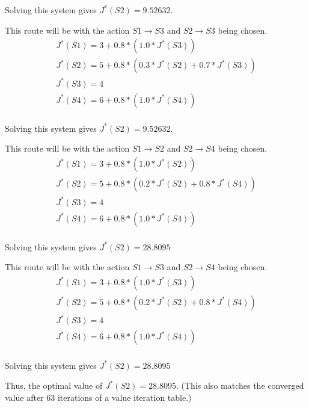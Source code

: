 \documentclass[11pt]{article}
\begin{document}
Solving this system gives $J^*(S2) = 9.52632$.

This route will be with the action $S1 \rightarrow S3$ and $S2 \rightarrow S3$ being chosen.
\begin{eqnarray*}
J^*(S1) = 3 + 0.8*(1.0 * J^*(S3))\\
J^*(S2) = 5 + 0.8*(0.3*J^*(S2) + 0.7*J^*(S3))\\
J^*(S3) = 4\\
J^*(S4) = 6 + 0.8*(1.0 * J^*(S4))\\
\end{eqnarray*}

Solving this system gives $J^*(S2) = 9.52632$.

This route will be with the action $S1 \rightarrow S2$ and $S2 \rightarrow S4$ being chosen.
\begin{eqnarray*}
J^*(S1) = 3 + 0.8*(1.0 * J^*(S2))\\
J^*(S2) = 5 + 0.8*(0.2*J^*(S2) + 0.8*J^*(S4))\\
J^*(S3) = 4\\
J^*(S4) = 6 + 0.8*(1.0 * J^*(S4))\\
\end{eqnarray*}

Solving this system gives $J^*(S2) = 28.8095$

This route will be with the action $S1 \rightarrow S3$ and $S2 \rightarrow S4$ being chosen.
\begin{eqnarray*}
J^*(S1) = 3 + 0.8*(1.0 * J^*(S3))\\
J^*(S2) = 5 + 0.8*(0.2*J^*(S2) + 0.8*J^*(S4))\\
J^*(S3) = 4\\
J^*(S4) = 6 + 0.8*(1.0 * J^*(S4))\\
\end{eqnarray*}

Solving this system gives $J^*(S2) = 28.8095$


Thus, the optimal value of $J^*(S2) = 28.8095$. (This also matches the converged value after 63 iterations of a value iteration table.)
\end{document}
